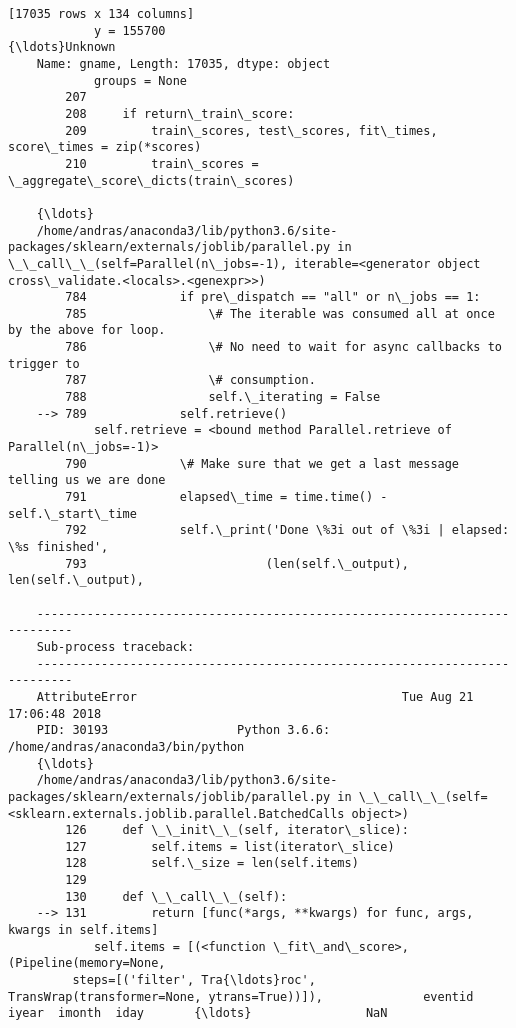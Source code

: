 \documentclass[11pt]{article}
\begin{document}
\begin{Verbatim}[commandchars=\\\{\}]
    [17035 rows x 134 columns]
            y = 155700                                          {\ldots}Unknown
    Name: gname, Length: 17035, dtype: object
            groups = None
        207 
        208     if return\_train\_score:
        209         train\_scores, test\_scores, fit\_times, score\_times = zip(*scores)
        210         train\_scores = \_aggregate\_score\_dicts(train\_scores)
    
    {\ldots}
    /home/andras/anaconda3/lib/python3.6/site-packages/sklearn/externals/joblib/parallel.py in \_\_call\_\_(self=Parallel(n\_jobs=-1), iterable=<generator object cross\_validate.<locals>.<genexpr>>)
        784             if pre\_dispatch == "all" or n\_jobs == 1:
        785                 \# The iterable was consumed all at once by the above for loop.
        786                 \# No need to wait for async callbacks to trigger to
        787                 \# consumption.
        788                 self.\_iterating = False
    --> 789             self.retrieve()
            self.retrieve = <bound method Parallel.retrieve of Parallel(n\_jobs=-1)>
        790             \# Make sure that we get a last message telling us we are done
        791             elapsed\_time = time.time() - self.\_start\_time
        792             self.\_print('Done \%3i out of \%3i | elapsed: \%s finished',
        793                         (len(self.\_output), len(self.\_output),
    
    ---------------------------------------------------------------------------
    Sub-process traceback:
    ---------------------------------------------------------------------------
    AttributeError                                     Tue Aug 21 17:06:48 2018
    PID: 30193                  Python 3.6.6: /home/andras/anaconda3/bin/python
    {\ldots}
    /home/andras/anaconda3/lib/python3.6/site-packages/sklearn/externals/joblib/parallel.py in \_\_call\_\_(self=<sklearn.externals.joblib.parallel.BatchedCalls object>)
        126     def \_\_init\_\_(self, iterator\_slice):
        127         self.items = list(iterator\_slice)
        128         self.\_size = len(self.items)
        129 
        130     def \_\_call\_\_(self):
    --> 131         return [func(*args, **kwargs) for func, args, kwargs in self.items]
            self.items = [(<function \_fit\_and\_score>, (Pipeline(memory=None,
         steps=[('filter', Tra{\ldots}roc', TransWrap(transformer=None, ytrans=True))]),              eventid  iyear  imonth  iday       {\ldots}                NaN  
    

\end{Verbatim}
\end{document}
